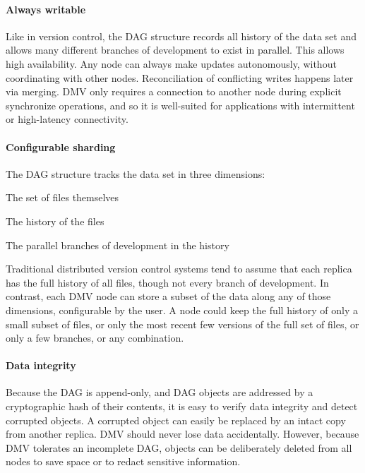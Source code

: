 \paragraph{Always writable}

Like in version control, the DAG structure records all history of the data set
and allows many different branches of development to exist in parallel. This
allows high availability. Any node can always make updates autonomously, without
coordinating with other nodes. Reconciliation of conflicting writes happens
later via merging. DMV only requires a connection to another node during
explicit synchronize operations, and so it is well-suited for applications with
intermittent or high-latency connectivity.


\paragraph{Configurable sharding}

The DAG structure tracks the data set in three dimensions:

\begin{tight_enumerate}
    \item The set of files themselves
    \item The history of the files
    \item The parallel branches of development in the history
\end{tight_enumerate}

Traditional distributed version control systems tend to assume that each replica
has the full history of all files, though not every branch of development. In
contrast, each DMV node can store a subset of the data along any of those
dimensions, configurable by the user. A node could keep the full history of only
a small subset of files, or only the most recent few versions of the full set of
files, or only a few branches, or any combination.


\paragraph{Data integrity}

Because the DAG is append-only, and DAG objects are addressed by a cryptographic
hash of their contents, it is easy to verify data integrity and detect corrupted
objects. A corrupted object can easily be replaced by an intact copy from
another replica. DMV should never lose data accidentally. However, because DMV
tolerates an incomplete DAG, objects can be deliberately deleted from all nodes
to save space or to redact sensitive information.


